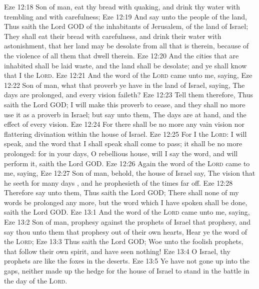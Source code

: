 \vs Eze 12:18 Son of man, eat thy bread with quaking, and drink thy water with trembling and with carefulness;
\vs Eze 12:19 And say unto the people of the land, Thus saith the Lord GOD of the inhabitants of Jerusalem,  of the land of Israel; They shall eat their bread with carefulness, and drink their water with astonishment, that her land may be desolate from all that is therein, because of the violence of all them that dwell therein.
\vs Eze 12:20 And the cities that are inhabited shall be laid waste, and the land shall be desolate; and ye shall know that I  the \textsc{Lord}.
\vs Eze 12:21 And the word of the \textsc{Lord} came unto me, saying,
\vs Eze 12:22 Son of man, what  that proverb  ye have in the land of Israel, saying, The days are prolonged, and every vision faileth?
\vs Eze 12:23 Tell them therefore, Thus saith the Lord GOD; I will make this proverb to cease, and they shall no more use it as a proverb in Israel; but say unto them, The days are at hand, and the effect of every vision.
\vs Eze 12:24 For there shall be no more any vain vision nor flattering divination within the house of Israel.
\vs Eze 12:25 For I  the \textsc{Lord}: I will speak, and the word that I shall speak shall come to pass; it shall be no more prolonged: for in your days, O rebellious house, will I say the word, and will perform it, saith the Lord GOD.
\vs Eze 12:26 Again the word of the \textsc{Lord} came to me, saying,
\vs Eze 12:27 Son of man, behold,  the house of Israel say, The vision that he seeth  for many days , and he prophesieth of the times  far off.
\vs Eze 12:28 Therefore say unto them, Thus saith the Lord GOD; There shall none of my words be prolonged any more, but the word which I have spoken shall be done, saith the Lord GOD.
\vs Eze 13:1 And the word of the \textsc{Lord} came unto me, saying,
\vs Eze 13:2 Son of man, prophesy against the prophets of Israel that prophesy, and say thou unto them that prophesy out of their own hearts, Hear ye the word of the \textsc{Lord};
\vs Eze 13:3 Thus saith the Lord GOD; Woe unto the foolish prophets, that follow their own spirit, and have seen nothing!
\vs Eze 13:4 O Israel, thy prophets are like the foxes in the deserts.
\vs Eze 13:5 Ye have not gone up into the gaps, neither made up the hedge for the house of Israel to stand in the battle in the day of the \textsc{Lord}.

